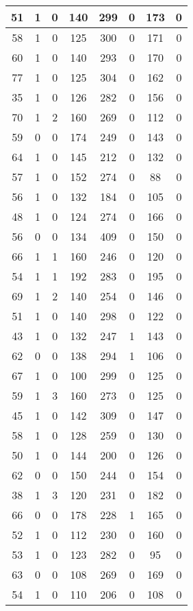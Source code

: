 \documentclass{article}
\begin{document}
\begin{longtable}{|c|c|c|c|c|c|c|c|}
51 & 1 & 0 & 140 & 299 & 0 & 173 & 0 \\ \hline
58 & 1 & 0 & 125 & 300 & 0 & 171 & 0 \\ \hline
60 & 1 & 0 & 140 & 293 & 0 & 170 & 0 \\ \hline
77 & 1 & 0 & 125 & 304 & 0 & 162 & 0 \\ \hline
35 & 1 & 0 & 126 & 282 & 0 & 156 & 0 \\ \hline
70 & 1 & 2 & 160 & 269 & 0 & 112 & 0 \\ \hline
59 & 0 & 0 & 174 & 249 & 0 & 143 & 0 \\ \hline
64 & 1 & 0 & 145 & 212 & 0 & 132 & 0 \\ \hline
57 & 1 & 0 & 152 & 274 & 0 & 88 & 0 \\ \hline
56 & 1 & 0 & 132 & 184 & 0 & 105 & 0 \\ \hline
48 & 1 & 0 & 124 & 274 & 0 & 166 & 0 \\ \hline
56 & 0 & 0 & 134 & 409 & 0 & 150 & 0 \\ \hline
66 & 1 & 1 & 160 & 246 & 0 & 120 & 0 \\ \hline
54 & 1 & 1 & 192 & 283 & 0 & 195 & 0 \\ \hline
69 & 1 & 2 & 140 & 254 & 0 & 146 & 0 \\ \hline
51 & 1 & 0 & 140 & 298 & 0 & 122 & 0 \\ \hline
43 & 1 & 0 & 132 & 247 & 1 & 143 & 0 \\ \hline
62 & 0 & 0 & 138 & 294 & 1 & 106 & 0 \\ \hline
67 & 1 & 0 & 100 & 299 & 0 & 125 & 0 \\ \hline
59 & 1 & 3 & 160 & 273 & 0 & 125 & 0 \\ \hline
45 & 1 & 0 & 142 & 309 & 0 & 147 & 0 \\ \hline
58 & 1 & 0 & 128 & 259 & 0 & 130 & 0 \\ \hline
50 & 1 & 0 & 144 & 200 & 0 & 126 & 0 \\ \hline
62 & 0 & 0 & 150 & 244 & 0 & 154 & 0 \\ \hline
38 & 1 & 3 & 120 & 231 & 0 & 182 & 0 \\ \hline
66 & 0 & 0 & 178 & 228 & 1 & 165 & 0 \\ \hline
52 & 1 & 0 & 112 & 230 & 0 & 160 & 0 \\ \hline
53 & 1 & 0 & 123 & 282 & 0 & 95 & 0 \\ \hline
63 & 0 & 0 & 108 & 269 & 0 & 169 & 0 \\ \hline
54 & 1 & 0 & 110 & 206 & 0 & 108 & 0 \\ \hline

\end{longtable}
\end{document}
